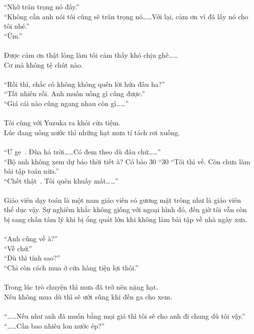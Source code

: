 \documentclass[12pt,a4paper, twosides]{book}
\begin{document}
“Nhớ trân trọng nó đấy.”\\
“Không cần anh nói tôi cũng sẽ trân trọng nó……Với lại, cảm ơn vì đã lấy nó cho tôi nhé.”\\
“Ừm.”\\
\\
Được cảm ơn thật lòng làm tôi cảm thấy khó chịu ghê……\\
Cơ mà không tệ chút nào.\\
\\
“Rồi thì, chắc cô không không quên lời hứa đâu ha?”\\
“Tất nhiên rồi. Anh muốn uống gì cũng được.”\\
“Giá cái nào cũng ngang nhau còn gì……”\\
\\
Tôi cùng với Yuzuka ra khỏi cửa tiệm.\\
Lúc đang uống nước thì những hạt mưa tí tách rơi xuống.\\
\\
“Ư ge~. Đùa hả trời……Có đem theo dù đâu chứ……”\\
“Bộ anh không xem dự báo thời tiết à? Có bảo 30%
“30%
“Tôi thì về. Còn chưa làm bài tập toán nữa.”\\
“Chết thật~. Tôi quên khuấy mất……”\\
\\
Giáo viên dạy toán là một nam giáo viên có gương mặt trông như là giáo viên thể dục vậy. Sự nghiêm khắc không giống với ngoại hình đó, đến giờ tôi vẫn còn bị sang chấn tâm lý khi bị ổng quát lớn khi không làm bài tập về nhà ngày xưa.\\
\\
“Anh cũng về à?”\\
“Về chứ.”\\
“Dù thì tính sao?”\\
“Chỉ còn cách mua ở cửa hàng tiện lợi thôi.”\\
\\
Trong lúc trò chuyện thì mưa đã trở nên nặng hạt.\\
Nếu không mua dù thì sẽ ướt sũng khi đến ga cho xem.\\
\\
“……Nếu như anh đã muốn bằng mọi giá thì tôi sẽ cho anh đi chung dù tôi vậy.”\\
“……Cần bao nhiêu lon nước ép?”\\
\end{document}
